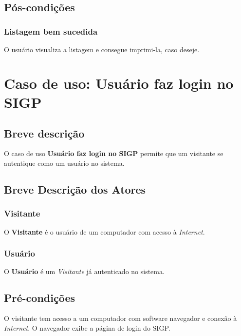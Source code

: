 \documentclass[11pt, a4paper,oneside]{book}
\begin{document}
\section{Pós-condições}

\subsection{Listagem bem sucedida}

O usuário visualiza a listagem e consegue imprimi-la, caso deseje.

%


\chapter[Caso de Uso]{Caso de uso: \bf Usuário faz login no SIGP}
\label{cap:casodeuso}	

\section{Breve descrição}

O caso de uso \textbf{Usuário faz login no SIGP} permite que um visitante se autentique como um usuário no sistema.

\section{Breve Descrição dos Atores}

\subsection{Visitante}

O \textbf{Visitante} é o usuário de um computador com acesso à \emph{Internet}.

\subsection{Usuário}

O \textbf{Usuário} é um \emph{Visitante} já autenticado no sistema.

\section{Pré-condições}
O visitante tem acesso a um computador com software navegador e conexão à \emph{Internet}.
O navegador exibe a página de login do SIGP.
\end{document}
